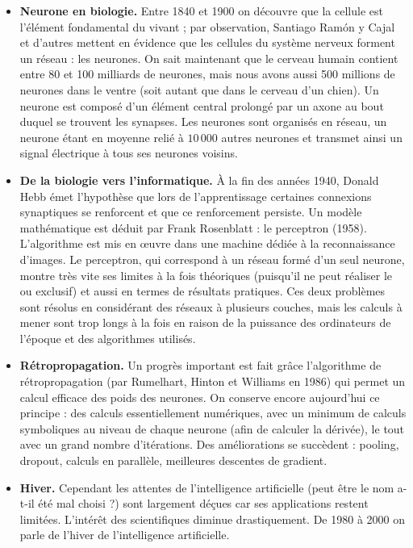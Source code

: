 \documentclass[11pt,class=report,crop=false]{standalone}
\begin{document}
\begin{itemize}
  \item \textbf{Neurone en biologie.} Entre 1840 et 1900 on découvre que la cellule est l'élément fondamental du vivant ; par observation, Santiago Ram\'on y Cajal et d'autres mettent en évidence que les cellules du système nerveux forment un réseau : les neurones.
  On sait maintenant que le cerveau humain contient entre 80 et 100 milliards de neurones, mais nous avons aussi 500 millions de neurones dans le ventre (soit autant que dans le cerveau d'un chien).
  Un neurone est composé d'un élément central prolongé par un axone au bout duquel se trouvent les synapses. Les neurones sont organisés en réseau, un neurone étant en moyenne relié à $10\,000$ autres neurones et transmet ainsi un signal électrique à tous ses neurones voisins. 
    
  \item \textbf{De la biologie vers l'informatique.} À la fin des années 1940, Donald Hebb  émet l'hypothèse que lors de l'apprentissage certaines connexions synaptiques se renforcent et que ce renforcement persiste. Un modèle mathématique est déduit par Frank Rosenblatt : le perceptron (1958). L'algorithme est mis en \oe uvre dans une machine dédiée à la reconnaissance d'images. 
  Le perceptron, qui correspond à un réseau formé d'un seul neurone, montre très vite ses limites à la fois théoriques (puisqu'il ne peut réaliser le \og{}ou exclusif\fg{}) et aussi en termes de résultats pratiques. Ces deux problèmes sont résolus en considérant des réseaux à plusieurs couches,  mais les calculs à mener sont trop longs à la fois en raison de la puissance des ordinateurs de l'époque et des algorithmes utilisés.  
  
  \item \textbf{Rétropropagation.} Un progrès important est fait grâce l'algorithme de rétropropagation (par Rumelhart, Hinton et Williams en 1986) qui permet un calcul efficace des poids des neurones. On conserve encore aujourd'hui ce principe : des calculs essentiellement numériques, avec un minimum de calculs symboliques au niveau de chaque neurone (afin de calculer la dérivée), le tout avec un grand nombre d'itérations. Des améliorations se succèdent : pooling, dropout, calculs en parallèle, meilleures descentes de gradient.
  
  \item \textbf{Hiver.} Cependant les attentes de l'intelligence artificielle (peut être le nom a-t-il été mal choisi ?) sont largement déçues car ses applications restent limitées. L'intérêt des scientifiques diminue drastiquement. De 1980 à 2000 on parle de l'hiver de l'intelligence artificielle.
  

\end{itemize}
\end{document}

